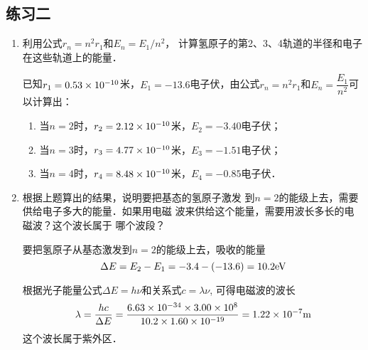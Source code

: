 \subsection{练习二}

\begin{enumerate}
    \item 利用公式$r_n=n^2r_1$和$E_n=E_1/n^2$，
计算氢原子的第2、3、4轨道的半径和电子在这些轨道上的能量．

\begin{solution}
已知$r_1=0.53\times10^{-10}$米，$E_1=-13.6$电子伏，由公式$r_n=n^2r_1$和$E_n=\dfrac{E_1}{n^2}$可以计算出：
\begin{enumerate}
    \item 当$n=2$时，$r_2=2.12\times10^{-10}$米，$E_2=-3.40$电子伏；
    \item 当$n=3$时，$r_3=4.77\times10^{-10}$米，$E_3=-1.51$电子伏；
    \item 当$n=4$时，$r_4=8.48\times10^{-10}$米，$E_4=-0.85$电子伏．
\end{enumerate}

\end{solution}
\item 根据上题算出的结果，说明要把基态的氢原子激发
到$n=2$的能级上去，需要供给电子多大的能量．如果用电磁
波来供给这个能量，需要用波长多长的电磁波？这个波长属于
哪个波段？

\begin{solution}
    要把氢原子从基态激发到$n=2$的能级上去，吸收的能量
    $$\Delta E=E_2-E_1=-3.4-(-13. 6)=10. 2{\rm eV}$$

    根据光子能量公式$\Delta E=h\nu$和关系式$c=\lambda \nu$, 可得电磁波的波长
\[\lambda=\frac{hc}{\Delta E}=\frac{6.63\times 10^{-34}\times 3.00\times 10^8}{10.2\times 1.60\times 10^{-19}}=1.22\times 10^{-7}{\rm m}\]
这个波长属于紫外区．
\end{solution}
\end{enumerate}



